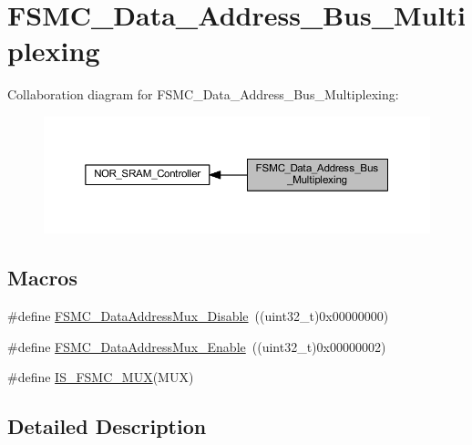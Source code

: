\hypertarget{group___f_s_m_c___data___address___bus___multiplexing}{}\section{F\+S\+M\+C\+\_\+\+Data\+\_\+\+Address\+\_\+\+Bus\+\_\+\+Multiplexing}
\label{group___f_s_m_c___data___address___bus___multiplexing}
Collaboration diagram for F\+S\+M\+C\+\_\+\+Data\+\_\+\+Address\+\_\+\+Bus\+\_\+\+Multiplexing\+:
\nopagebreak
\begin{figure}[H]
\begin{center}
\leavevmode
\includegraphics[width=350pt]{group___f_s_m_c___data___address___bus___multiplexing}
\end{center}
\end{figure}
\subsection*{Macros}
\begin{DoxyCompactItemize}
\item 
\#define \hyperlink{group___f_s_m_c___data___address___bus___multiplexing_ga62d92adbcbcc1d6ec9a04de1b343744a}{F\+S\+M\+C\+\_\+\+Data\+Address\+Mux\+\_\+\+Disable}~((uint32\+\_\+t)0x00000000)
\item 
\#define \hyperlink{group___f_s_m_c___data___address___bus___multiplexing_ga1dd4d12e63aaf29dbb8ae4b613f2aa15}{F\+S\+M\+C\+\_\+\+Data\+Address\+Mux\+\_\+\+Enable}~((uint32\+\_\+t)0x00000002)
\item 
\#define \hyperlink{group___f_s_m_c___data___address___bus___multiplexing_ga546fcab8c1b751b4a959ba2ce5b35d79}{I\+S\+\_\+\+F\+S\+M\+C\+\_\+\+M\+UX}(M\+UX)
\end{DoxyCompactItemize}


\subsection{Detailed Description}


